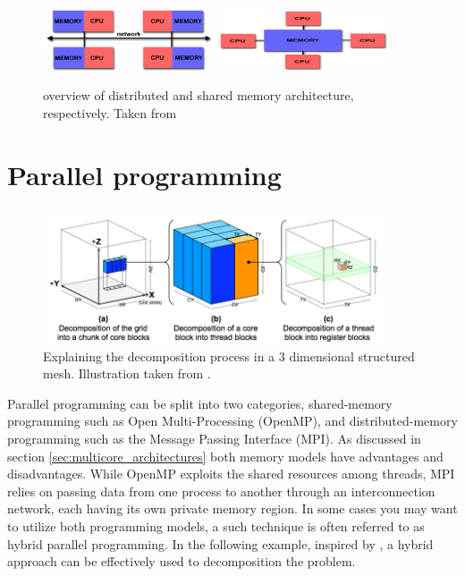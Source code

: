 \begin{figure}[!h]
  \begin{center}
    \label{b_distributed_memory.png}
    \includegraphics[width=0.45\textwidth]{bilder/b_distributed_memory}
    \label{b_shared_memory.png}
    \includegraphics[width=0.45\textwidth]{bilder/b_shared_memory}
  \end{center}
  \caption{overview of distributed and shared memory architecture, respectively. Taken from \cite{article8}}
  \label{b_memory_hierarchy}
\end{figure}

\section{Parallel programming}
\label{sec:problem_decomposition}
\begin{figure}[h]
 \centering 
     \includegraphics[width=0.9\textwidth]{bilder/b_decomposition}
     \caption{Explaining the decomposition process in a 3 dimensional structured mesh. Illustration taken from \cite{article9}.
     \label{b_decomposition.png}}
\end{figure}
Parallel programming can be split into two categories, shared-memory programming such as Open Multi-Processing (OpenMP), and distributed-memory programming such as the Message Passing Interface (MPI). As discussed in section \ref{sec:multicore_architectures} both memory models have advantages and disadvantages. While OpenMP exploits the shared resources among threads, MPI relies on passing data from one process to another through an interconnection network, each having its own private memory region. In some cases you may want to utilize both programming models, a such technique is often referred to as hybrid parallel programming. In the following example, inspired by \cite{article9}, a hybrid approach can be effectively used to decomposition the problem.

